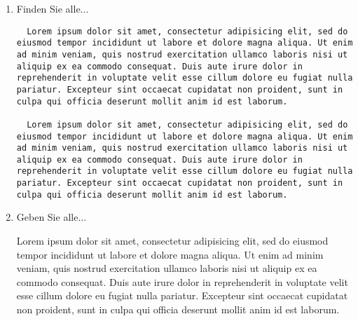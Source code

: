 \begin{enumerate}[1)]

\item Finden Sie alle...

\answerspace{8cm}
\begin{loesung}
\begin{verbatim}
  Lorem ipsum dolor sit amet, consectetur adipisicing elit, sed do eiusmod tempor incididunt ut labore et dolore magna aliqua. Ut enim ad minim veniam, quis nostrud exercitation ullamco laboris nisi ut aliquip ex ea commodo consequat. Duis aute irure dolor in reprehenderit in voluptate velit esse cillum dolore eu fugiat nulla pariatur. Excepteur sint occaecat cupidatat non proident, sunt in culpa qui officia deserunt mollit anim id est laborum.
  
  Lorem ipsum dolor sit amet, consectetur adipisicing elit, sed do eiusmod tempor incididunt ut labore et dolore magna aliqua. Ut enim ad minim veniam, quis nostrud exercitation ullamco laboris nisi ut aliquip ex ea commodo consequat. Duis aute irure dolor in reprehenderit in voluptate velit esse cillum dolore eu fugiat nulla pariatur. Excepteur sint occaecat cupidatat non proident, sunt in culpa qui officia deserunt mollit anim id est laborum.
\end{verbatim}
\end{loesung}



\item Geben Sie alle...

\begin{loesung}
  Lorem ipsum dolor sit amet, consectetur adipisicing elit, sed do eiusmod tempor incididunt ut labore et dolore magna aliqua. Ut enim ad minim veniam, quis nostrud exercitation ullamco laboris nisi ut aliquip ex ea commodo consequat. Duis aute irure dolor in reprehenderit in voluptate velit esse cillum dolore eu fugiat nulla pariatur. Excepteur sint occaecat cupidatat non proident, sunt in culpa qui officia deserunt mollit anim id est laborum.
\end{loesung}

\end{enumerate}

\clearpage